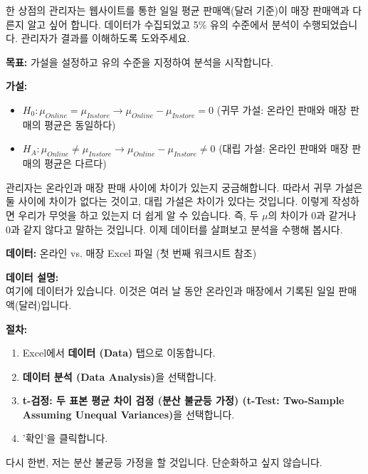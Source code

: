 \documentclass[11pt,a4paper]{book}
\theoremstyle{definition}
\begin{document}
\begin{examplebox}[title=Excel 실습 예시: 온라인 vs. 매장 판매 (신뢰 구간)]
한 상점의 관리자는 웹사이트를 통한 일일 평균 판매액(달러 기준)이 매장 판매액과 다른지 알고 싶어 합니다. 데이터가 수집되었고 5\% 유의 수준에서 분석이 수행되었습니다. 관리자가 결과를 이해하도록 도와주세요.

\textbf{목표:} 가설을 설정하고 유의 수준을 지정하여 분석을 시작합니다.
\end{examplebox}

\begin{infobox}[title=온라인/매장 Excel 워크시트 (2/10): 가설 설정]
\textbf{가설:}
\begin{itemize}
    \item $H_0 : \mu_{Online} = \mu_{Instore} \rightarrow \mu_{Online} - \mu_{Instore} = 0$ (귀무 가설: 온라인 판매와 매장 판매의 평균은 동일하다)
    \item $H_A : \mu_{Online} \neq \mu_{Instore} \rightarrow \mu_{Online} - \mu_{Instore} \neq 0$ (대립 가설: 온라인 판매와 매장 판매의 평균은 다르다)
\end{itemize}
관리자는 온라인과 매장 판매 사이에 차이가 있는지 궁금해합니다. 따라서 귀무 가설은 둘 사이에 차이가 없다는 것이고, 대립 가설은 차이가 있다는 것입니다. 이렇게 작성하면 우리가 무엇을 하고 있는지 더 쉽게 알 수 있습니다. 즉, 두 $\mu$의 차이가 0과 같거나 0과 같지 않다고 말하는 것입니다. 이제 데이터를 살펴보고 분석을 수행해 봅시다.
\end{infobox}

\begin{infobox}[title=온라인/매장 Excel 워크시트 (3/10): 데이터 준비]
\textbf{데이터:} 온라인 vs. 매장 Excel 파일 (첫 번째 워크시트 참조)

\textbf{데이터 설명:} \\
여기에 데이터가 있습니다. 이것은 여러 날 동안 온라인과 매장에서 기록된 일일 판매액(달러)입니다.
\end{infobox}

\begin{infobox}[title=온라인/매장 Excel 워크시트 (4/10): Excel에서 t-검정 선택]
\textbf{절차:}
\begin{enumerate}
    \item Excel에서 \textbf{데이터 (Data)} 탭으로 이동합니다.
    \item \textbf{데이터 분석 (Data Analysis)}을 선택합니다.
    \item \textbf{t-검정: 두 표본 평균 차이 검정 (분산 불균등 가정) (t-Test: Two-Sample Assuming Unequal Variances)}을 선택합니다.
    \item '확인'을 클릭합니다.
\end{enumerate}
다시 한번, 저는 분산 불균등 가정을 할 것입니다. 단순화하고 싶지 않습니다.
\end{infobox}
\end{document}
